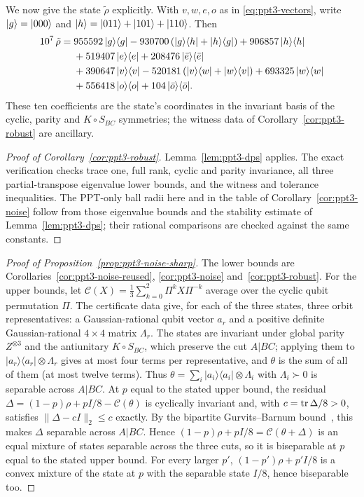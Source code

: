 We now give the state $\tilde\rho$ explicitly. With $v,w,e,o$ as in \eqref{eq:ppt3-vectors}, write $\lvert g\rangle=\lvert000\rangle$ and
$\lvert h\rangle=\lvert011\rangle+\lvert101\rangle+\lvert110\rangle$. Then
\begin{equation}\label{eq:ppt3-tilde-rho}
\begin{aligned}
10^7\,\tilde\rho={}&955592\,\lvert g\rangle\langle g\rvert-930700\,(\lvert g\rangle\langle h\rvert+\lvert h\rangle\langle g\rvert)+906857\,\lvert h\rangle\langle h\rvert\\
&+519407\,\lvert e\rangle\langle e\rvert+208476\,\lvert\bar e\rangle\langle\bar e\rvert\\
&+390647\,\lvert v\rangle\langle v\rvert-520181\,(\lvert v\rangle\langle w\rvert+\lvert w\rangle\langle v\rvert)+693325\,\lvert w\rangle\langle w\rvert\\
&+556418\,\lvert o\rangle\langle o\rvert+104\,\lvert\bar o\rangle\langle\bar o\rvert.
\end{aligned}
\end{equation}
These ten coefficients are the state's coordinates in the invariant basis of the cyclic, parity and $K\circ S_{BC}$
symmetries; the witness data of Corollary~\ref{cor:ppt3-robust} are ancillary.

\begin{proof}[Proof of Corollary~\ref{cor:ppt3-robust}]
Lemma~\ref{lem:ppt3-dps} applies. The exact verification checks trace one, full rank, cyclic and parity invariance, all
three partial-transpose eigenvalue lower bounds, and the witness and tolerance inequalities. The PPT-only ball radii here
and in the table of Corollary~\ref{cor:ppt3-noise} follow from those eigenvalue bounds and the stability estimate of
Lemma~\ref{lem:ppt3-dps}; their rational comparisons are checked against the same constants.
\end{proof}

\begin{proof}[Proof of Proposition~\ref{prop:ppt3-noise-sharp}]
The lower bounds are Corollaries~\ref{cor:ppt3-noise-reused}, \ref{cor:ppt3-noise} and~\ref{cor:ppt3-robust}. For the
upper bounds, let $\mathcal C(X)=\frac13\sum_{k=0}^2\Pi^kX\Pi^{-k}$ average over the cyclic qubit permutation $\Pi$. The
certificate data give, for each of the three states, three orbit representatives: a Gaussian-rational qubit vector $a_r$ and a
positive definite Gaussian-rational $4\times4$ matrix $\Lambda_r$. The states are invariant under global parity $Z^{\otimes3}$ and
the antiunitary $K\circ S_{BC}$, which preserve the cut $A|BC$; applying them to $|a_r\rangle\langle a_r|\otimes\Lambda_r$ gives at most four terms
per representative, and $\theta$ is the sum of all of them (at most twelve terms). Thus $\theta=\sum_i|a_i\rangle\langle a_i|\otimes\Lambda_i$ with $\Lambda_i\succ0$
is separable across $A|BC$.
At $p$ equal to the stated upper bound, the residual $\Delta=(1-p)\rho+pI/8-\mathcal C(\theta)$ is cyclically invariant and, with $c=\operatorname{tr}\Delta/8>0$,
satisfies $\|\Delta-cI\|_2\le c$ exactly. By the bipartite Gurvits--Barnum bound~\cite{GB}, this makes $\Delta$
separable across $A|BC$. Hence
$(1-p)\rho+pI/8=\mathcal C(\theta+\Delta)$ is an equal mixture of states separable across the three cuts, so it is biseparable at
$p$ equal to the stated upper bound. For every larger $p'$, $(1-p')\rho+p'I/8$ is a convex mixture of the state at $p$ with the
separable state $I/8$, hence biseparable too.
\end{proof}
